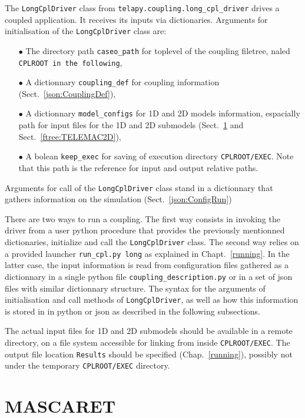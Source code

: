 \documentclass[Coupling]{../../data/TelemacDoc} %
\begin{document}
The \texttt{LongCplDriver} class from \texttt{telapy.coupling.long\_cpl\_driver} drives a coupled
application. It receives its inputs via dictionaries. 
Arguments for initialisation of the \texttt{LongCplDriver} class are:
\begin{itemize}
\item[$\bullet$] The directory path \texttt{caseo\_path} for toplevel of the coupling filetree, naled \texttt{CPLROOT in the following}, 
\item[$\bullet$] A dictionnary \texttt{coupling\_def} for coupling information (Sect.~\ref{json:CouplingDef}),
\item[$\bullet$] A dictionnary \texttt{model\_configs} for 1D and 2D models information, espacially path for input files for the 1D and 2D submodels (Sect.~\ref{ftree:MASCARET} and Sect.~\ref{ftree:TELEMAC2D}), 
\item[$\bullet$] A bolean \texttt{keep\_exec} for saving of execution directory \texttt{CPLROOT/EXEC}. Note that this path is the reference for input and output relative paths.
\end{itemize}
Arguments for call of the \texttt{LongCplDriver} class stand in a dictionnary that gathers information on the simulation (Sect.~\ref{json:ConfigRun})

There are two ways to run a coupling. The first way consists in
invoking the driver from a user python procedure that provides the
previously mentionned dictionaries, initialize and call the
\texttt{LongCplDriver} class. The second way relies on a provided
launcher \texttt{run\_cpl.py long} as explained in Chapt.~\ref{running}. In the latter case, the input information is read from configuration files gathered as a dictionnary in a single python file \texttt{coupling\_description.py} 
or in a set of json files with similar dictionnary structure.  
The syntax for the arguments of initialisation and call methods of 
\texttt{LongCplDriver}, as well as how this information is stored in 
in python or json as described in the following subsections. 

The actual input files for 1D and 2D submodels should be available in a remote directory, on a file system accessible for linking from inside \texttt{CPLROOT/EXEC}. 
The output file location \texttt{Results} should be specified (Chap.~\ref{running}), possibly not under the temporary \texttt{CPLROOT/EXEC} directory.

\section{MASCARET}\label{ftree:MASCARET}
\end{document}
